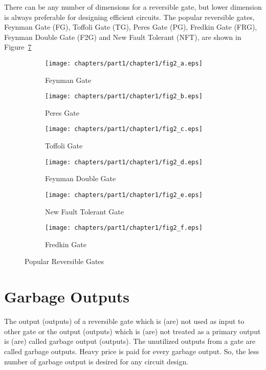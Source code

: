 \begin{example}\textnormal{
	There can be any number of dimensions for a reversible gate, but lower dimension is always preferable for designing efficient circuits. The popular reversible gates, Feynman Gate (FG), Toffoli Gate (TG), Peres Gate (PG), Fredkin Gate (FRG), Feynman Double Gate (F2G) and New Fault Tolerant (NFT), are shown in Figure~\ref{fig:p1_c1_fig2}}
\end{example}
\begin{figure}[H]
	\centering
	\begin{subfigure}[b]{0.30\textwidth}
		\centering
		\texttt{[image: chapters/part1/chapter1/fig2\_a.eps]}
		\caption{Feynman Gate}
		\label{fig:p1_c1_fig2_a}
	\end{subfigure}
	\begin{subfigure}[b]{0.30\textwidth}
		\centering
		\texttt{[image: chapters/part1/chapter1/fig2\_b.eps]}
		\caption{Peres Gate}
		\label{fig:p2_c1_fig2_b}
	\end{subfigure}
	\begin{subfigure}[b]{0.30\textwidth}
		\centering
		\texttt{[image: chapters/part1/chapter1/fig2\_c.eps]}
		\caption{Toffoli Gate}
		\label{fig:p1_c1_fig2_c}
	\end{subfigure}

\begin{subfigure}[b]{0.30\textwidth}
	\centering
	\texttt{[image: chapters/part1/chapter1/fig2\_d.eps]}
	\caption{Feynman Double Gate}
	\label{fig:p1_c1_fig2_d}
\end{subfigure}
\begin{subfigure}[b]{0.30\textwidth}
	\centering
	\texttt{[image: chapters/part1/chapter1/fig2\_e.eps]}
	\caption{New Fault Tolerant Gate}
	\label{fig:p1_c1_fig2_e}
\end{subfigure}
\begin{subfigure}[b]{0.30\textwidth}
	\centering
	\texttt{[image: chapters/part1/chapter1/fig2\_f.eps]}
	\caption{Fredkin Gate}
	\label{fig:p1_c1_fig2_f}
\end{subfigure}
	\caption{Popular Reversible Gates}
	\label{fig:p1_c1_fig2}
\end{figure}

\section{Garbage Outputs}

The  output (outputs)  of  a reversible  gate which is  (are)  not used as input to other gate or  the  output  (outputs) which is (are) not treated as a primary output is  (are) called garbage output (outputs). The unutilized outputs 
from a gate are called garbage outputs. Heavy price is paid for every garbage output. So, the less number of garbage output  is desired  for any circuit design.


